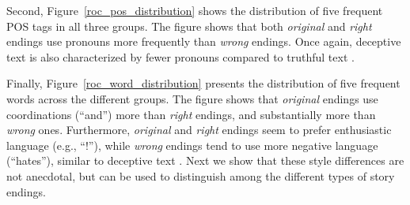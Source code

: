 \documentclass[11pt,a4paper]{article}
\newcommand{\figref}[1]{Figure~\ref{#1}}
\begin{document}
Second, \figref{roc_pos_distribution} shows the distribution of five frequent POS tags in all three groups. 
The figure shows that both {\it original} and {\it right} endings use pronouns more frequently than {\it wrong} endings.
Once again, deceptive text is also characterized by fewer pronouns compared to truthful text \cite{Newman:2003}.


Finally, \figref{roc_word_distribution} presents the distribution of five frequent words across the different groups. 
The figure shows that {\it original} endings use coordinations (``and'') more than  {\it right} endings, and substantially more than {\it wrong} ones. 
Furthermore, {\it original} and {\it right} endings seem to prefer
enthusiastic language (e.g., ``!''), while {\it wrong} endings tend to
use more negative language (``hates''), similar to deceptive text \cite{Newman:2003}.
Next we show that these style differences are not anecdotal, but can
be used to distinguish among the different types of story endings.
\end{document}
